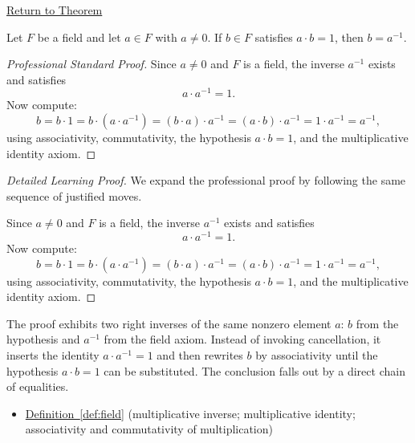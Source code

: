 \newpage
{}
\label{prf:uniqueness-of-multiplicative-inverse}

\begin{remark*}[Return]
\hyperref[thm:uniqueness-of-multiplicative-inverse]{Return to Theorem}
\end{remark*}

\begin{theorem*}
Let $F$ be a field and let $a\in F$ with $a\neq 0$.  If $b\in F$
satisfies $a\cdot b = 1$, then $b = a^{-1}$.
\end{theorem*}

\begin{proof}[Professional Standard Proof]
\LRAProofBodyStart
Since $a\neq 0$ and $F$ is a field, the inverse $a^{-1}$ exists and satisfies
\[
a\cdot a^{-1}=1.
\]
Now compute:
\[
b=b\cdot 1=b\cdot(a\cdot a^{-1})=(b\cdot a)\cdot a^{-1}=(a\cdot b)\cdot a^{-1}=1\cdot a^{-1}=a^{-1},
\]
using associativity, commutativity, the hypothesis $a\cdot b=1$, and the
multiplicative identity axiom.
\end{proof}

\begin{proof}[Detailed Learning Proof]
\LRAProofBodyStart
We expand the professional proof by following the same sequence of justified moves.

Since $a\neq 0$ and $F$ is a field, the inverse $a^{-1}$ exists and satisfies
\[
a\cdot a^{-1}=1.
\]
Now compute:
\[
b=b\cdot 1=b\cdot(a\cdot a^{-1})=(b\cdot a)\cdot a^{-1}=(a\cdot b)\cdot a^{-1}=1\cdot a^{-1}=a^{-1},
\]
using associativity, commutativity, the hypothesis $a\cdot b=1$, and the
multiplicative identity axiom.
\end{proof}

\begin{remark*}
The proof exhibits two right inverses of the same nonzero element $a$:
$b$ from the hypothesis and $a^{-1}$ from the field axiom.  Instead of
invoking cancellation, it inserts the identity $a\cdot a^{-1}=1$ and then
rewrites $b$ by associativity until the hypothesis $a\cdot b=1$ can be
substituted.  The conclusion falls out by a direct chain of equalities.
\end{remark*}

\begin{dependencies}
\begin{itemize}
  \item \hyperref[def:field]{Definition~\ref*{def:field}}
        \textnormal{(multiplicative inverse; multiplicative identity; associativity and commutativity of multiplication)}
\end{itemize}
\end{dependencies}

\clearpage
